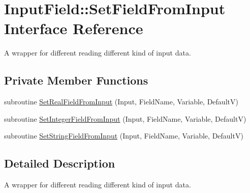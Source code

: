 \hypertarget{interface_input_field_1_1_set_field_from_input}{
\section{InputField::SetFieldFromInput Interface Reference}
\label{interface_input_field_1_1_set_field_from_input}
}


A wrapper for different reading different kind of input data.  
\subsection*{Private Member Functions}
\begin{DoxyCompactItemize}
\item 
subroutine \hyperlink{interface_input_field_1_1_set_field_from_input_a93672a36fcf7b02f97f52accd2d36650}{SetRealFieldFromInput} (Input, FieldName, Variable, DefaultV)
\item 
subroutine \hyperlink{interface_input_field_1_1_set_field_from_input_a4e15a441aa157e6aa5602b5972afcdad}{SetIntegerFieldFromInput} (Input, FieldName, Variable, DefaultV)
\item 
subroutine \hyperlink{interface_input_field_1_1_set_field_from_input_af5d724423ed22249a203879cb52da6b8}{SetStringFieldFromInput} (Input, FieldName, Variable, DefaultV)
\end{DoxyCompactItemize}


\subsection{Detailed Description}
A wrapper for different reading different kind of input data. 


